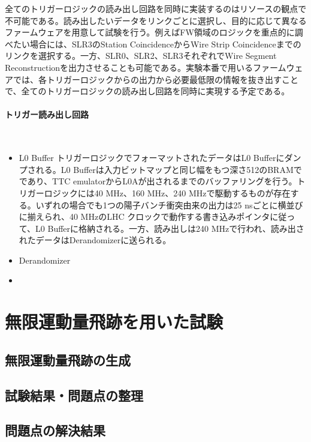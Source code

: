 全てのトリガーロジックの読み出し回路を同時に実装するのはリソースの観点で不可能である。読み出したいデータをリンクごとに選択し、目的に応じて異なるファームウェアを用意して試験を行う。例えばFW領域のロジックを重点的に調べたい場合には、SLR3のStation CoincidenceからWire Strip Coincidenceまでのリンクを選択する。一方、SLR0、SLR2、SLR3それぞれでWire Segment Reconstructionを出力させることも可能である。実験本番で用いるファームウェアでは、各トリガーロジックからの出力から必要最低限の情報を抜き出すことで、全てのトリガーロジックの読み出し回路を同時に実現する予定である。

\paragraph{トリガー読み出し回路}　　
\par
\begin{itemize}
    \item L0 Buffer 
    トリガーロジックでフォーマットされたデータはL0 Bufferにダンプされる。L0 Bufferは入力ビットマップと同じ幅をもつ深さ512のBRAMでであり、TTC emulatorからL0Aが出されるまでのバッファリングを行う。トリガーロジックには40 MHz、160 MHz、240 MHzで駆動するものが存在する。いずれの場合でも1つの陽子バンチ衝突由来の出力は25 nsごとに横並びに揃えられ、40 MHzのLHC クロックで動作する書き込みポインタに従って、L0 Bufferに格納される。一方、読み出しは240 MHzで行われ、読み出されたデータはDerandomizerに送られる。

    \item Derandomizer
    \item 
\end{itemize}

\section{無限運動量飛跡を用いた試験}
\label{sec_IMT}

\subsection{無限運動量飛跡の生成}
\label{subsec_IMT_generation}

\subsection{試験結果・問題点の整理}
\label{subsec_IMT_result}

\subsection{問題点の解決結果}
\label{subsec_IMT_solution}


